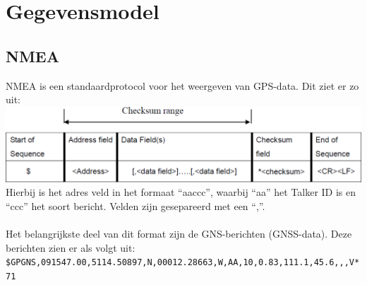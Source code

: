 \section{Gegevensmodel}
\subsection{NMEA}
NMEA is een standaardprotocol voor het
weergeven van GPS-data. Dit ziet er zo uit: \\
\includegraphics[width=\textwidth]{technical/nmea}
\\Hierbij is het adres veld in het formaat ``aaccc'', waarbij ``aa'' het
Talker ID is en ``ccc'' het soort bericht. Velden zijn gesepareerd met
een ``,''.
\citep{Navspark}\\\\
Het belangrijkste deel van dit format zijn de GNS-berichten
(GNSS-data). Deze berichten zien er als volgt uit:\\
\texttt{\$GPGNS,091547.00,5114.50897,N,00012.28663,W,AA,10,0.83,111.1,45.6,,,V*71}

